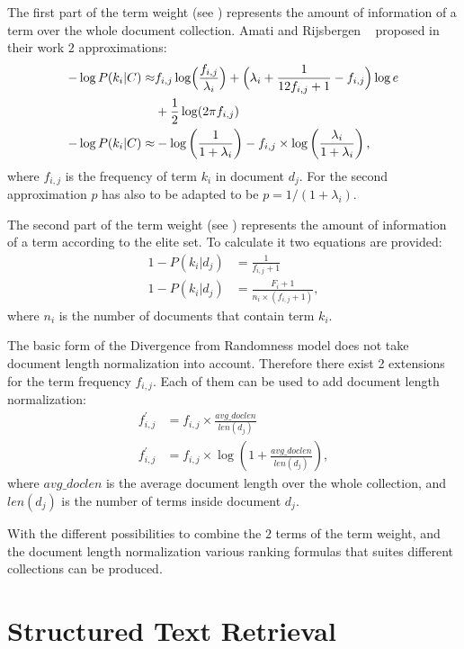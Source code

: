 The first part of the term weight (see ) represents the amount of information of a term over the whole document collection. Amati and Rijsbergen ~\cite{AmatiR02} proposed in their work $2$ approximations:
\begin{align}
    - \log P(k_i | C) \approx & f_{i, j} \log \Bigl( \frac{f_{i, j}}{\lambda_i} \Bigr) + \Bigl( \lambda_i + \frac{1}{12 f_{i, j} + 1} - f_{i, j}\Bigr) \log e \\
    & + \frac{1}{2} \log(2 \pi f_{i, j}) \nonumber \\
  - \log P(k_i | C) \approx & - \log \left( \frac{1}{1 + \lambda_i} \right) - f_{i, j} \times \log \left( \frac{\lambda_i}{1 + \lambda_i} \right),
\end{align}
where $f_{i, j}$ is the frequency of term $k_i$ in document $d_j$. For the second approximation $p$ has also to be adapted to be $p = 1/(1 + \lambda_i)$.

The second part of the term weight (see ) represents the amount of information of a term according to the elite set. To calculate it two equations are provided:
\begin{align}
  1 - P(k_i | d_j) & = \frac{1}{f_{i, j} + 1} \\
  1 - P(k_i | d_j) & = \frac{F_i + 1}{n_i \times (f_{i, j} + 1)},
\end{align}
where $n_i$ is the number of documents that contain term $k_i$.

The basic form of the Divergence from Randomness model does not take document length normalization into account. Therefore there exist 2 extensions for the term frequency $f_{i, j}$. Each of them can be used to add document length normalization:
\begin{align}
  f^{\prime}_{i, j} & = f_{i, j} \times \frac{avg\_doclen}{len(d_j)} \\
  f^{\prime}_{i, j} & = f_{i, j} \times \log \left(1 + \frac{avg\_doclen}{len(d_j)} \right),
\end{align}
where $avg\_doclen$ is the average document length over the whole collection, and $len(d_j)$ is the number of terms inside document $d_j$.

With the different possibilities to combine the $2$ terms of the term weight, and the document length normalization various ranking formulas that suites different collections can be produced.

\section{Structured Text Retrieval}
\label{sec:structured_text_Retrieval}

